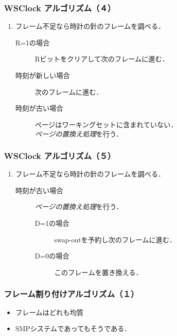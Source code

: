 \documentclass[unicode,handout]{beamer}                   %
\begin{document}
\begin{frame}
  \frametitle{WSClock アルゴリズム（４）}


  \begin{enumerate}
  \item[3.] フレーム不足なら時計の針のフレームを調べる．
    \begin{description}
    \item[R=1の場合]
      Rビットをクリアして次のフレームに進む．
    \item[時刻が新しい場合]
      次のフレームに進む．
    \item[時刻が古い場合]
      ページはワーキングセットに含まれていない．\\
      \emph{ページの置換え処理}を行う．
    \end{description}
  \end{enumerate}
\end{frame}

\begin{frame}
  \frametitle{WSClock アルゴリズム（５）}


  \begin{enumerate}
  \item[3.] フレーム不足なら時計の針のフレームを調べる．
    \begin{description}
    \item[時刻が古い場合] \emph{ページの置換え処理}を行う．
      \begin{description}
      \item[D=1の場合]
        swap-outを予約し次のフレームに進む．
      \item[D=0の場合]
        このフレームを置き換える．
      \end{description}
    \end{description}
  \end{enumerate}
\end{frame}

\begin{frame}
  \frametitle{フレーム割り付けアルゴリズム（１）}
  \begin{itemize}
  \item フレームはどれも均質
  \item SMPシステムであってもそうである．
  \end{itemize}
\end{frame}
\end{document}
